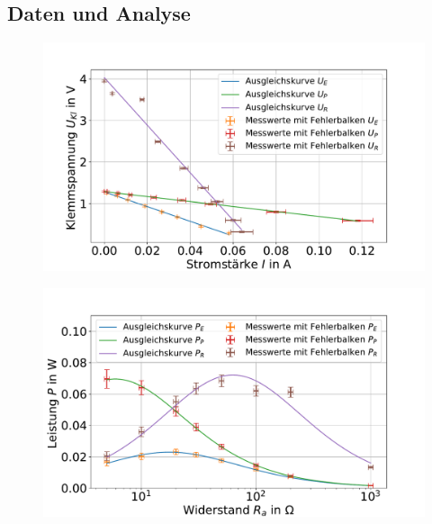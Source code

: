 \subsection{Daten und Analyse}












\begin{figure}[h]
	\centering
	\includegraphics[width=0.9\linewidth]{"auswertung/Auswertung Innenwiderstand/Batterie Gesamt U"}
	\caption{}
	\label{fig:batt-ges-u}
\end{figure}







\begin{figure}[h]
	\centering
	\includegraphics[width=0.9\linewidth]{"auswertung/Auswertung Innenwiderstand/Batterie Gesamt P"}
	\caption{}
	\label{fig:batt-ges-p}
\end{figure}




